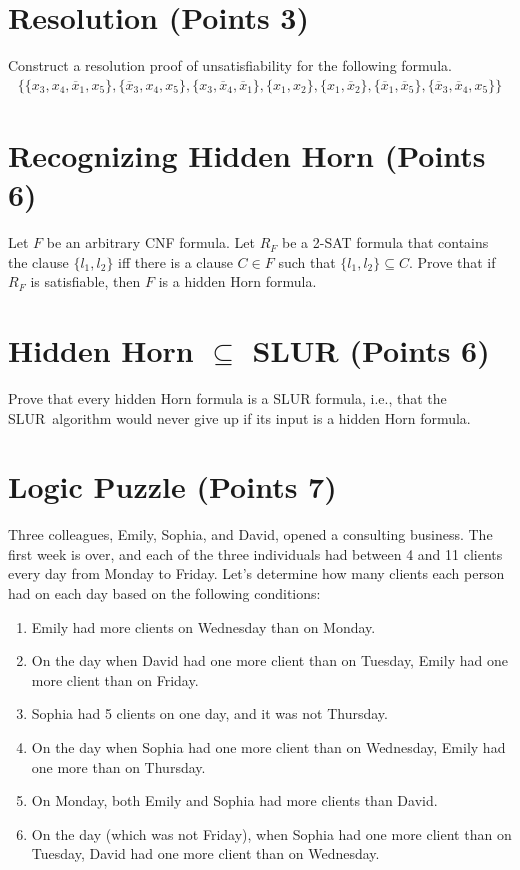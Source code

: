 \documentclass{article}
\begin{document}

\section{Resolution (Points 3)}

Construct a resolution proof of unsatisfiability for the following formula.
\vspace*{-1ex}
\begin{align*}
\bigl\{
\{x_{3}, x_{4}, \overline x_{1}, x_{5} \}, 
\{\overline x_{3}, x_{4}, x_{5} \}, 
\{x_{3}, \overline x_{4}, \overline x_{1} \}, 
\{x_{1}, x_{2} \}, 
\{x_{1}, \overline x_{2} \},  
\{\overline x_{1}, \overline x_{5} \}, 
\{\overline x_{3}, \overline x_{4}, x_{5}\}
\bigr\}
\end{align*}

\section{Recognizing Hidden Horn (Points 6)}

Let $F$ be an arbitrary CNF formula.
Let $R_F$ be a 2-SAT formula that contains the clause $\{l_1, l_2\}$ iff there is a clause $C \in F$ such that $\{l_1,l_2\} \subseteq C$.
Prove that if $R_F$ is satisfiable, then $F$ is a hidden Horn formula.

\section{Hidden Horn $\subseteq$ SLUR (Points 6)}

Prove that every hidden Horn formula is a SLUR formula, i.e., that the SLUR~algorithm would never give up if its input is a hidden Horn formula.

\section{Logic Puzzle (Points 7)}

Three colleagues, Emily, Sophia, and David, opened a consulting business.
The first week is over, and each of the three individuals had between 4 and 11 clients every day from Monday to Friday.
Let's determine how many clients each person had on each day based on the following conditions:
\begin{enumerate}\itemindent=-10pt
\item Emily had more clients on Wednesday than on Monday.
\item On the day when David had one more client than on Tuesday, Emily had one more client than on Friday.
\item Sophia had 5 clients on one day, and it was not Thursday.
\item On the day when Sophia had one more client than on Wednesday, Emily had one more than on Thursday.
\item On Monday, both Emily and Sophia had more clients than David.
\item On the day (which was not Friday), when Sophia had one more client than on Tuesday, David had one more client than on Wednesday.
\end{enumerate}
\end{document}
